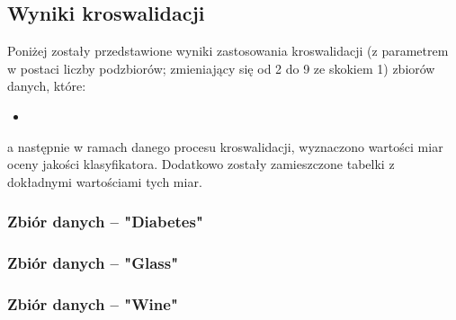 \pagebreak
\subsection{Wyniki kroswalidacji}
    Poniżej zostały przedstawione wyniki zastosowania kroswalidacji (z parametrem
    w postaci liczby podzbiorów; zmieniający się od 2 do 9 ze skokiem 1) zbiorów danych,
    które:
    \begin{itemize}
      \item{}
    \end{itemize}
    a następnie w ramach danego procesu kroswalidacji, wyznaczono wartości miar
    oceny jakości klasyfikatora. Dodatkowo zostały zamieszczone tabelki z dokładnymi
    wartościami tych miar.

    \subsubsection{Zbiór danych -- "Diabetes"}
        
        

    \pagebreak
    \subsubsection{Zbiór danych -- "Glass"}
        
        

    \pagebreak
    \subsubsection{Zbiór danych -- "Wine"}
        
        
